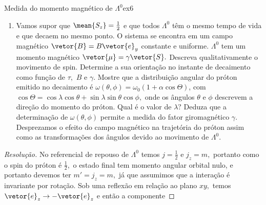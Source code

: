 \begin{exercício}{Medida do momento magnético de \(\Lambda^0\)}{ex6}
\begin{enumerate}[label=(\alph*)]
         \(\pi^- + p \to \Lambda^0 + K^0.\) Devido à conservação de momento \(\vetor{p}_\pi, \vetor{p}_\Lambda,\) e \(\vetor{p}_K\) são coplanares. Tomamos \(\vetor{e}_z\) como o eixo perpendicular a esse plano,
         \begin{equation*}
            \vetor{e}_z = \frac{\vetor{p}_\pi \times \vetor{p}_\Lambda}{\norm{\vetor{p}_\pi \times \vetor{p}_\Lambda}},
         \end{equation*}
         e tomamos \(\vetor{p}_\Lambda = p_\Lambda \vetor{e}_y.\) Sabendo que paridade é conservada na reação de produção e que os prótons não são polarizados, mostre que se \(\vetor{S}\) é o operador de spin de \(\Lambda^0,\) então \(\mean{S_x} = \mean{S_y} = 0.\)
      \item Vamos supor que \(\mean{S_z} = \frac12\) e que todos \(\Lambda^0\) têm o mesmo tempo de vida e que decaem no mesmo ponto. O sistema se encontra em um campo magnético \(\vetor{B} = B \vetor{e}_y\) constante e uniforme. \(\Lambda^0\) tem um momento magnético \(\vetor{\mu} = \gamma \vetor{S}.\) Descreva qualitativamente o movimento de spin. Determine a sua orientação no instante de decaimento como função de \(\tau,\) \(B\) e \(\gamma\). Mostre que a distribuição angular do próton emitido no decaimento é \(\omega(\theta, \phi) = \omega_0 (1 + \alpha \cos\Theta)\), com \(\cos\Theta = \cos \lambda \cos\theta + \sin \lambda \sin \theta \cos \phi,\) onde os ângulos \(\theta\) e \(\phi\) descrevem a direção do momento do próton. Qual é o valor de \(\lambda?\) Deduza que a determinação de \(\omega(\theta,\phi)\) permite a medida do fator giromagnético \(\gamma\). Desprezamos o efeito do campo magnético na trajetória do próton assim como as transformações dos ângulos devido ao movimento de \(\Lambda^0.\)
   \end{enumerate}
\end{exercício}
\begin{proof}[Resolução]
   No referencial de repouso de \(\Lambda^0\) temos \(j = \frac12\) e \(j_z = m,\) portanto como o spin do próton é \(\frac12,\) o estado final tem momento angular orbital nulo, e portanto devemos ter \(m' = j_z = m,\) já que assumimos que a interação é invariante por rotação. Sob uma reflexão em relação ao plano \(xy,\) temos \(\vetor{e}_z \to -\vetor{e}_z\) e então a componente 
\end{proof}
